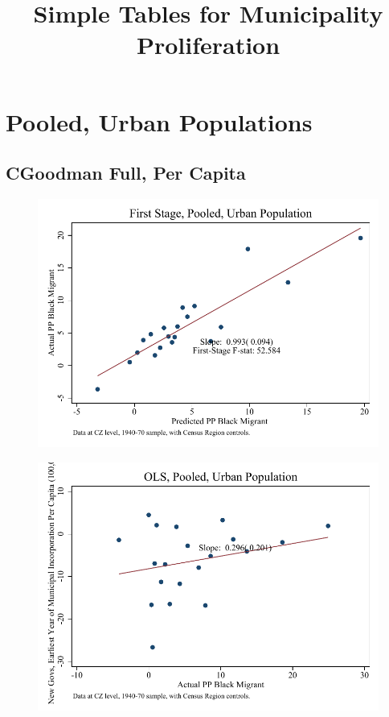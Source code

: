\documentclass{article}
\title{Simple Tables for Municipality Proliferation}
\begin{document}
\maketitle
\tableofcontents
{\footnotesize 
\listoffigures
\listoftables}
\clearpage

\section{Pooled, Urban Populations}


\subsection{CGoodman Full, Per Capita}

\clearpage
\begin{figure}
\centering
\includegraphics{figures/simplefigs/pooled_cgoodman_pc_C3_urban_fs.pdf}
\end{figure}
\clearpage
\begin{figure}
\centering
\includegraphics{figures/simplefigs/pooled_cgoodman_pc_C3_urban_ols.pdf}
\end{figure}
\end{document}
